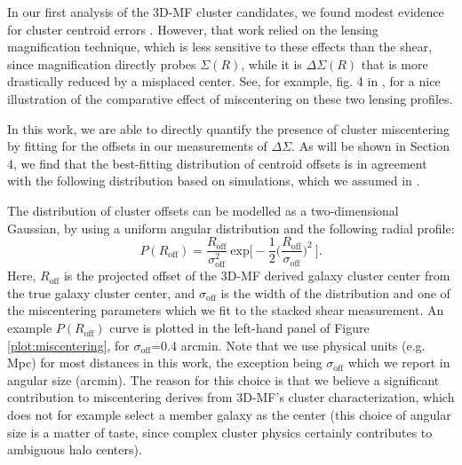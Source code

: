 In our first analysis of the \ac{3D-MF} cluster candidates, we found modest evidence for cluster centroid errors \citep{Ford14}. However, that work relied on the lensing magnification technique, which is less sensitive to these effects than the shear, since magnification directly probes $\Sigma(R)$, while it is $\Delta\Sigma(R)$ that is more drastically reduced by a misplaced center. See, for example, fig. 4 in \citet{Johnston07}, for a nice illustration of the comparative effect of miscentering on these two lensing profiles. 

In this work, we are able to directly quantify the presence of cluster miscentering by fitting for the offsets in our measurements of $\Delta\Sigma$. As will be shown in Section 4, we find that the best-fitting distribution of centroid offsets is in agreement with the following distribution based on simulations, which we assumed in \citet{Ford14}. 

The distribution of cluster offsets can be modelled as a two-dimensional Gaussian, by using a uniform angular distribution and the following radial profile:
\begin{equation}
P(R_{\mathrm{off}})=\frac{R_{\mathrm{off}}}{\sigma_{\mathrm{off}}^2}\ \mathrm{exp}\bigg[-\frac{1}{2}\bigg(\frac{R_{\mathrm{off}}}{\sigma_{\mathrm{off}}}\bigg)^2\ \bigg].
\end{equation}
Here, $R_{\mathrm{off}}$ is the projected offset of the \ac{3D-MF} derived galaxy cluster center from the true galaxy cluster center, and $\sigma_{\mathrm{off}}$ is the width of the distribution and one of the miscentering parameters which we fit to the stacked shear measurement. An example $P(R_{\mathrm{off}})$ curve is plotted in the left-hand panel of Figure \ref{plot:miscentering}, for $\sigma_{\mathrm{off}}$=0.4 arcmin. Note that we use physical units (e.g. Mpc) for most distances in this work, the exception being $\sigma_{\mathrm{off}}$ which we report in angular size (arcmin). The reason for this choice is that we believe a significant contribution to miscentering derives from \ac{3D-MF}'s cluster characterization, which does not for example select a member galaxy as the center (this choice of angular size is a matter of taste, since complex cluster physics certainly contributes to ambiguous halo centers). 


